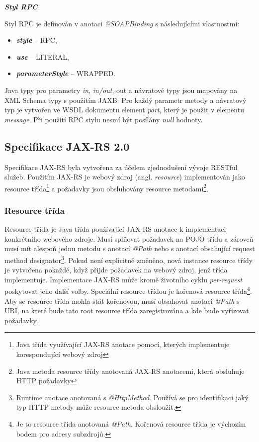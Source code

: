 \documentclass[11pt,twoside,a4paper]{book}
\begin{document}
\textbf{\textit{Styl RPC}}

Styl RPC je definován v anotaci {\em @SOAPBinding} s následujícími vlastnostmi:

\begin{itemize}
  \item \textbf{\textit{style}} – RPC,
  \item \textbf{\textit{use}} – LITERAL,
  \item \textbf{\textit{parameterStyle}} – WRAPPED.
\end{itemize}

Java typy pro parametry {\em in}, {\em in/out}, out a návratové typy jsou
mapovány na XML Schema typy s použitím JAXB. Pro každý parametr metody a návratový typ je vytvořen ve WSDL
dokumentu element {\em part}, který je použit v elementu {\em message}. Při
použití RPC stylu nesmí být posílány {\em null} hodnoty.

\subsection{Specifikace JAX-RS 2.0}
\label{subsec:specifikace-jax-rs}

Specifikace JAX-RS \cite{JAXRS20} byla vytvořena za účelem zjednodušení vývoje
RESTful služeb.
Použitím JAX-RS je webový zdroj (angl. {\em resource})  implementován jako
resource třída\footnote{Java třída využívající JAX-RS anotace pomocí,
kterých implementuje korespondující webový zdroj} a požadavky jsou obsluhovány resource
metodami\footnote{Java metoda resource třídy anotovaná JAX-RS
anotacemi, která obsluhuje HTTP požadavky}.

\subsubsection{Resource třída}
\label{subsec:resource-trida}

Resource třída je Java třída používající JAX-RS anotace k implementaci
konkrétního webového zdroje. Musí splňovat požadavek na POJO třídu a zároveň
musí mít alespoň jednu metodu s anotací {\em @Path} nebo s anotací obsahující
request method designator\footnote{Runtime anotace anotovaná s {\em
@HttpMethod}.
Používá se pro identifikaci jaký typ HTTP metody může resource metoda
obsloužit.}.
Pokud není explicitně změněno, nová instance resource třídy je vytvořena
pokaždé, když přijde požadavek na webový zdroj, jenž třída implementuje.
Implementace JAX-RS může kromě životního cyklu {\em per-request} poskytovat
jeho další volby. Speciální resource třídou je kořenová resource
třída\footnote{Je to resource třída anotovaná {\em @Path}. Kořenová resource
třída je výchozím bodem pro adresy subzdrojů.}.
Aby se resource třída mohla stát kořenovou, musí obsahovat anotaci {\em @Path} s
URI, na které bude tato root resource třída zaregistrována a kde bude vyřizovat požadavky. \cite{JAXRS20}
\end{document}
